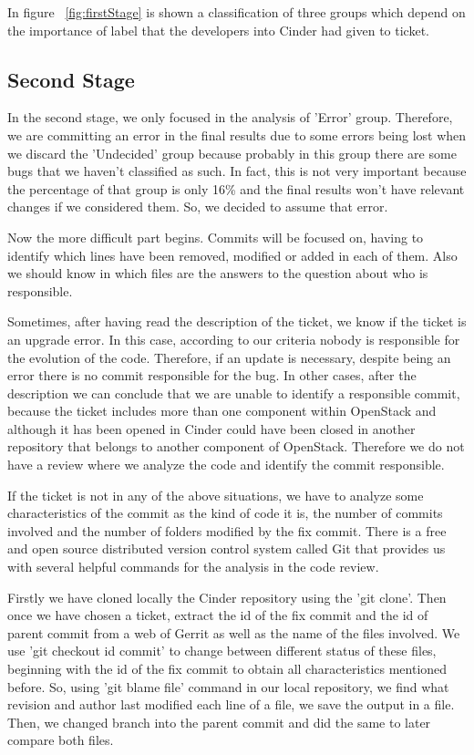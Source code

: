 \documentclass[a4paper]{article}
\begin{document}
In figure ~\ref{fig:firstStage} is shown a classification of three groups which depend on the importance of label that the developers into Cinder had given to ticket.

\subsection{Second Stage}

In the second stage, we only focused in the analysis of 'Error' group. Therefore, we are committing an error in the final results due to some errors being lost when we discard the 'Undecided' group because probably in this group there are some bugs that we haven't  classified as such. In fact, this is not very important because the percentage of that group is only 16\% and the final results won't have relevant changes if we considered them. So, we decided to assume that error. 

Now the more difficult part begins. Commits will be focused on, having to identify which lines have been removed, modified or added in each of them. Also we should know in which files are the answers to the question about who is responsible. 

Sometimes, after having read the description of the ticket, we know if the ticket is an upgrade error. In this case, according to our criteria nobody is responsible for the evolution of the code. Therefore, if an update is necessary, despite being an error there is no commit responsible for the bug. In other cases, after the description we can conclude that we are unable to identify a responsible commit, because the ticket includes more than one component within OpenStack and although it has been opened in Cinder could have been closed in another repository that belongs to another component of OpenStack. Therefore we do not have a review where we analyze the code and identify the commit responsible.

If the ticket is not in any of the above situations, we have to analyze some characteristics of the commit as the kind of code it is, the number of commits involved and the number of folders modified by the fix commit. There is a free and open source distributed version control system called Git that provides us with several helpful commands for the analysis in the code review. 

Firstly we have cloned locally the Cinder repository using the 'git clone'. Then once we have chosen a ticket, extract the id of the fix commit and the id of parent commit from a web of Gerrit as well as the name of the files involved. We use 'git checkout id commit' to change between different status of these files, beginning with the id of the fix commit to obtain all characteristics mentioned before. So, using 'git blame file' command in our local repository, we find what revision and author last modified each line of a file, we save the output in a file. Then, we changed branch into the parent commit and did the same to later compare both files. 
\end{document}
